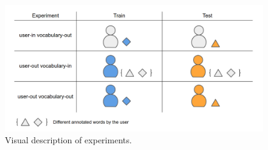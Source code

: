 \begin{figure}[h]
    \centering
    \includegraphics[width=14cm]{Images/Experiments.png}
    \caption{Visual description of experiments.}
    \label{fig:experiments-description}
\end{figure} 


